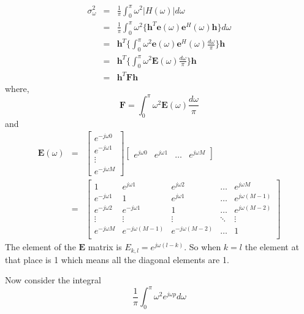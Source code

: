 \begin{appendix}
\begin{eqnarray}
\sigma_{\omega}^{2}&=&\frac{1}{\pi} \int_{0}^{\pi}\omega^{2} |H(\omega)|d\omega\\
&=&\frac{1}{\pi} \int_{0}^{\pi}\omega^{2} \{\mathbf{h}^{T}\mathbf{e}(\omega)\mathbf{e}^{H}(\omega)\mathbf{h}\}d\omega\\
&=&\mathbf{h}^{T}\{\int_{0}^{\pi}\omega^{2}\mathbf{e}(\omega)\mathbf{e}^{H}(\omega)\frac{d\omega}{\pi}\}\mathbf{h}\\
&=&\mathbf{h}^{T}\{\int_{0}^{\pi}\omega^{2}\mathbf{E}(\omega)\frac{d\omega}{\pi}\}\mathbf{h}\\
&=&\mathbf{h}^{T}\mathbf{F}\mathbf{h}
\end{eqnarray}
where,
\begin{equation}
\mathbf{F}=\int_{0}^{\pi}\omega^{2}\mathbf{E}(\omega)\frac{d\omega}{\pi}
\label{eq:F equation}
\end{equation}
and
\begin{eqnarray}
\mathbf{E}(\omega)&=&
\begin{bmatrix}
    e^{-j\omega 0}
\\ e^{-j\omega 1} 
\\ \vdots
\\ e^{-j\omega M}   
\end{bmatrix}
\begin{bmatrix}
    e^{j\omega 0}
& e^{j\omega 1} 
& \ldots
& e^{j\omega M}   
\end{bmatrix}\\
&=&
\begin{bmatrix}
1 & e^{j\omega 1}& e^{j\omega 2} & \ldots & e^{j\omega M}\\
e^{-j\omega 1} &  1& e^{j\omega 1} & \ldots & e^{j\omega (M-1)}\\
e^{-j\omega 2} & e^{-j\omega 1}& 1 & \ldots & e^{j\omega (M-2)}\\
\vdots & \vdots& \vdots & \ddots & \vdots\\
e^{-j\omega M} & e^{-j\omega (M-1)}& e^{-j\omega (M-2)} & \ldots & 1\\
\label{eq:E matrix}
\end{bmatrix}
\end{eqnarray}
The element of the $\mathbf{E}$ matrix is $E_{k,l} =e^{j\omega (l-k)}$.
So when $k=l$ the element at that place is 1 which means all the diagonal elements are 1.

Now consider the integral
\begin{equation*}
\frac{1}{\pi}\int_{0}^{\pi}\omega^{2} e^{j\omega p}d\omega
\end{equation*}\\


\end{appendix}
